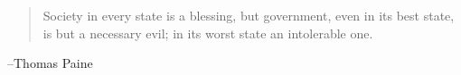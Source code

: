 \documentclass[letterpaper, landscape]{exam}
\begin{document}
  \ifprintanswers{}
  \else
    \vspace{8 cm}
    \begin{quote}
      \begin{em}
        Society in every state is a blessing, but government, even in its best state, is but a
        necessary evil; in its worst state an intolerable one. 
      \end{em}
    \end{quote}
    \hspace{1 cm} --Thomas Paine
  \fi
\end{document}
